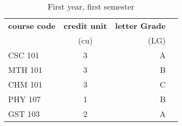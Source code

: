 \documentclass{article}
\begin{document}
	\begin{table}[h!]
		\begin{center}
			\caption{First year, first semester}
			\label{tab: table 1}
			\begin{tabular}{l|c|r|c}
				\textbf{course code} & \textbf{credit unit} & \textbf{letter Grade}\\
				&(cu) &(LG)\\
				\hline
				CSC 101 & 3 & A\\
				MTH 101 & 3 & B\\
				CHM 101 & 3 & C\\
				PHY 107 & 1 & B\\
				GST 103 & 2 & A\\
			\end{tabular}
		\end{center}
	\end{table}
\end{document}

